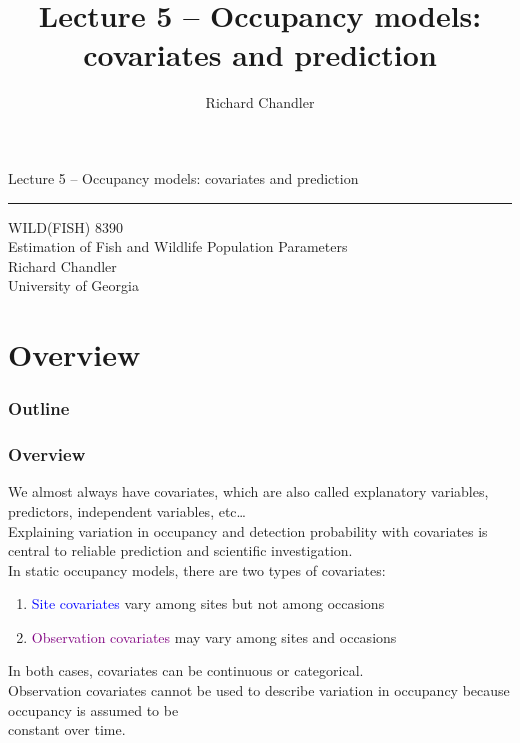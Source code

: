 \documentclass[color=usenames,dvipsnames]{beamer}\usepackage[]{graphicx}\usepackage[]{color}
\title{Lecture 5 -- Occupancy models: covariates and prediction }
\author{Richard Chandler}
\begin{document}
\begin{frame}[plain]
  \LARGE
  \centering
  {\huge Lecture 5 -- Occupancy models: covariates and prediction} \\
  {\color{default} \rule{\textwidth}{0.1pt}}
  \vfill
  \large
  WILD(FISH) 8390 \\
  Estimation of Fish and Wildlife Population Parameters \\
  \vfill
  \large
  Richard Chandler \\
  University of Georgia \\
\end{frame}






\section{Overview}



\begin{frame}[plain]
  \frametitle{Outline}
  \Large
\end{frame}



\begin{frame}
  \frametitle{Overview}
  We almost always have covariates, which are also called explanatory
  variables, predictors, independent variables, etc\dots \\
  \pause
  \vfill
  Explaining variation in occupancy and detection probability with
  covariates is central to reliable prediction and scientific
  investigation. \\  
  \pause
  \vfill
  In static occupancy models, there are two types of covariates:
  \begin{enumerate}
    \item \textcolor{blue}{Site covariates} vary among sites
      but not among occasions
    \item \textcolor{Purple}{Observation covariates} may vary among
      sites and occasions
  \end{enumerate}
  \pause
  \vfill
  In both cases, covariates can be continuous or categorical. \\
  \pause
  \vfill
  \centering
  \alert{Observation covariates cannot be used to describe variation
    in occupancy because occupancy is assumed to be \\ constant over
    time.} \\ 
\end{frame}
\end{document}
